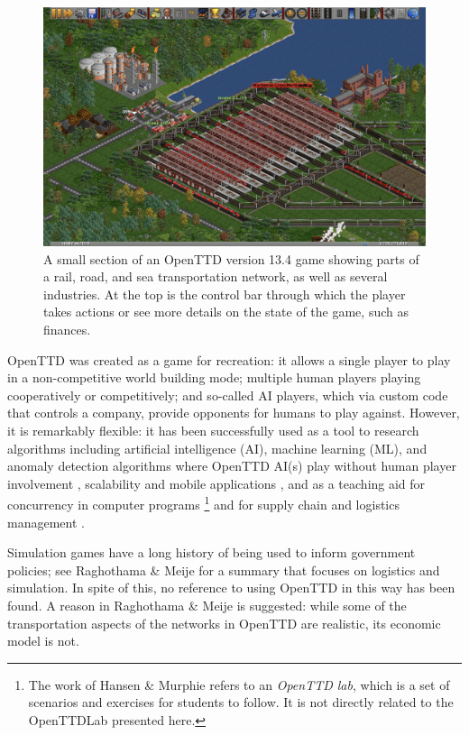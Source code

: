 \documentclass[logo,msc,dsti]{style/infthesis}    %
\newcommand{\singlespacedfootnote}[1]{{\singlespace\footnote{#1}}}
\begin{document}
\begin{figure}[ht]
\centering
\includegraphics[width=\columnwidth]{assets/openttd_screenshot.png}
\caption{A small section of an OpenTTD version 13.4 game showing parts of a rail, road, and sea transportation network, as well as several industries. At the top is the control bar through which the player takes actions or see more details on the state of the game, such as finances.}
\label{figure:introduction-screenshot}
\end{figure}

OpenTTD was created as a game for recreation: it allows a single player to play in a non-competitive world building mode; multiple human players playing cooperatively or competitively; and so-called AI players, which via custom code that controls a company, provide opponents for humans to play against. However, it is remarkably flexible: it has been successfully used as a tool to research algorithms including artificial intelligence (AI), machine learning (ML), and anomaly detection algorithms where OpenTTD AI(s) play without human player involvement \cite{beuneker2019autonomous, bijlsma2014evolving, konijnendijk2015mcts, lakomy2020railroad, rios2009trains, wisniewski2011artificial, volna2017fuzzy}, scalability and mobile applications \cite{jiang2018mirroring}, and as a teaching aid for concurrency in computer programs \cite{HansenMuprhie2018, marmorstein2015teaching}\singlespacedfootnote{The work of Hansen \& Murphie \cite{HansenMuprhie2018} refers to an \emph{OpenTTD lab}, which is a set of scenarios and exercises for students to follow. It is not directly related to the OpenTTDLab presented here.} and for supply chain and logistics management \cite{doi:10.1080/10494820.2016.1242503}.

Simulation games have a long history of being used to inform government policies; see Raghothama \& Meije \cite{raghothama2013review} for a summary that focuses on logistics and simulation. In spite of this, no reference to using OpenTTD in this way has been found. A reason in Raghothama \& Meije \cite{raghothama2013review} is suggested: while some of the transportation aspects of the networks in OpenTTD are realistic, its economic model is not.
\end{document}
